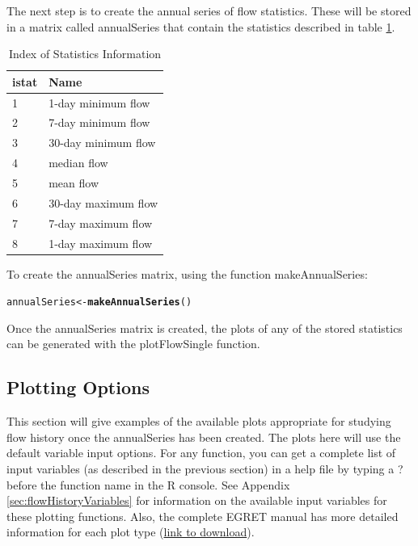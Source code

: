 \documentclass[a4paper,11pt]{article}\usepackage{graphicx, color}
\makeatletter
\newcommand{\hlfunctioncall}[1]{\textcolor[rgb]{0.501960784313725,0,0.329411764705882}{\textbf{#1}}}%
\newenvironment{kframe}{%
 \def\at@end@of@kframe{}%
 \ifinner\ifhmode%
  \def\at@end@of@kframe{\end{minipage}}%
  \begin{minipage}{\columnwidth}%
 \fi\fi%
 \def\FrameCommand##1{\hskip\@totalleftmargin \hskip-\fboxsep
 \colorbox{shadecolor}{##1}\hskip-\fboxsep
     \hskip-\linewidth \hskip-\@totalleftmargin \hskip\columnwidth}%
 \MakeFramed {\advance\hsize-\width
   \@totalleftmargin\z@ \linewidth\hsize
   \@setminipage}}%
 {\par\unskip\endMakeFramed%
 \at@end@of@kframe}
\newenvironment{knitrout}{}{} %
\makeatother
\begin{document}
The next step is to create the annual series of flow statistics.  These will be stored in a matrix called annualSeries that contain the statistics described in table \ref{table:istat}.

\begin{table}[!ht]
\centering
\caption{Index of Statistics Information} 
\label{table:istat}
\begin{tabular}{ll}
  \hline
istat & Name \\ 
  \hline
1 & 1-day minimum flow \\ 
  2 & 7-day minimum flow \\ 
  3 & 30-day minimum flow \\ 
  4 & median flow \\ 
  5 & mean flow \\ 
  6 & 30-day maximum flow \\ 
  7 & 7-day maximum flow \\ 
  8 & 1-day maximum flow \\ 
   \hline
\end{tabular}
\end{table}

To create the annualSeries matrix, using the function makeAnnualSeries:
\begin{knitrout}
\color{fgcolor}\begin{kframe}
\begin{alltt}
annualSeries <- \hlfunctioncall{makeAnnualSeries}()
\end{alltt}
\end{kframe}
\end{knitrout}


Once the annualSeries matrix is created, the plots of any of the stored statistics can be generated with the plotFlowSingle function.

\subsection{Plotting Options}
\label{sec:plotOptions}
This section will give examples of the available plots appropriate for studying flow history once the annualSeries has been created. The plots here will use the default variable input options.  For any function, you can get a complete list of input variables (as described in the previous section) in a help file by typing a ? before the function name in the R console. See Appendix \ref{sec:flowHistoryVariables} for information on the available input variables for these plotting functions. Also, the complete EGRET manual has more detailed information for each plot type (\href{https://github.com/USGS-R/EGRET/raw/Documentation/EGRET%2Bmanual_4.doc}{link to download}).
\end{document}
